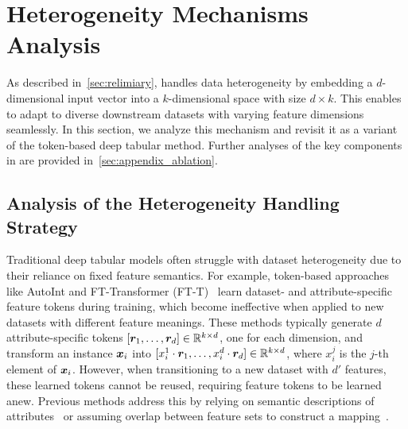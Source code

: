 \section{Heterogeneity Mechanisms Analysis}\label{sec:heterogeneous}
As described in~\autoref{sec:relimiary}, \ours handles data heterogeneity by embedding a $d$-dimensional input vector into a $k$-dimensional space with size $d \times k$. This enables \ours to adapt to diverse downstream datasets with varying feature dimensions seamlessly. 
In this section, we analyze this mechanism and revisit it as a variant of the token-based deep tabular method. Further analyses of the key components in \ours are provided in~\autoref{sec:appendix_ablation}.

\subsection{Analysis of the Heterogeneity Handling Strategy}
Traditional deep tabular models often struggle with dataset heterogeneity due to their reliance on fixed feature semantics. For example, token-based approaches like AutoInt \cite{SongS0DX0T19AutoInt} and FT-Transformer (FT-T)~\cite{GorishniyRKB21Revisiting} learn dataset- and attribute-specific feature tokens during training, which become ineffective when applied to new datasets with different feature meanings. These methods typically generate $d$ attribute-specific tokens $[{\bm{r}}_1, \ldots, {\bm{r}}_d] \in {\mathbb{R}}^{k \times d}$, one for each dimension, and transform an instance ${\bm{x}}_i$ into $[{x_i^1} \cdot {\bm{r}}_1, \ldots, {x_i^d} \cdot {\bm{r}}_d] \in {\mathbb{R}}^{k \times d}$, where $x_i^j$ is the $j$-th element of ${\bm{x}}_i$.
However, when transitioning to a new dataset with $d'$ features, these learned tokens cannot be reused, requiring feature tokens to be learned anew. Previous methods address this by relying on semantic descriptions of attributes~\cite{Yan2024Making} or assuming overlap between feature sets to construct a mapping~\cite{Onishi2023TabRet, Zhou2023TabToken}.

